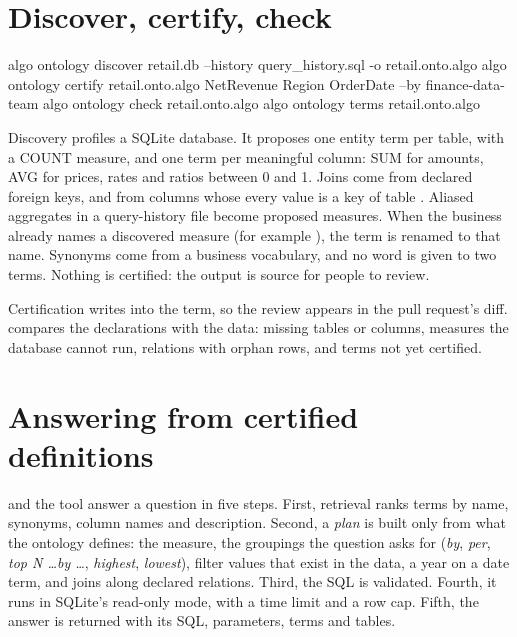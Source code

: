 \section{Discover, certify, check}

\begin{plaincode}[title=Command line]
algo ontology discover retail.db --history query_history.sql -o retail.onto.algo
algo ontology certify retail.onto.algo NetRevenue Region OrderDate --by finance-data-team
algo ontology check retail.onto.algo
algo ontology terms retail.onto.algo
\end{plaincode}

Discovery profiles a SQLite database. It proposes one entity term per table, with a COUNT measure, and one term per meaningful column: SUM for amounts, AVG for prices, rates and ratios between 0 and 1. Joins come from declared foreign keys, and from  columns whose every value is a key of table . Aliased aggregates in a query-history file become proposed measures. When the business already names a discovered measure (for example ), the term is renamed to that name. Synonyms come from a business vocabulary, and no word is given to two terms. Nothing is certified: the output is source for people to review.

Certification writes  into the term, so the review appears in the pull request's diff.  compares the declarations with the data: missing tables or columns, measures the database cannot run, relations with orphan rows, and terms not yet certified.

\section{Answering from certified definitions}

 and the  tool answer a question in five steps. First, retrieval ranks terms by name, synonyms, column names and description. Second, a \emph{plan} is built only from what the ontology defines: the measure, the groupings the question asks for (\emph{by}, \emph{per}, \emph{top N \ldots by \ldots}, \emph{highest}, \emph{lowest}), filter values that exist in the data, a year on a date term, and joins along declared relations. Third, the SQL is validated. Fourth, it runs in SQLite's read-only mode, with a time limit and a row cap. Fifth, the answer is returned with its SQL, parameters, terms and tables.

